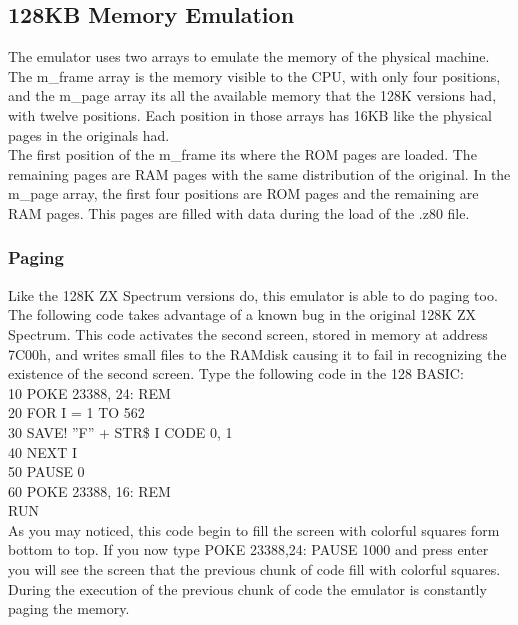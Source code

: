 \subsection{128KB Memory Emulation}
The emulator uses two arrays to emulate the memory of the physical machine. The m\_frame array is the memory visible to the CPU, with only four positions, and the m\_page array its all the available memory that the 128K versions had, with twelve positions. Each position in those arrays has 16KB like the physical pages in the originals had.\\
\indent The first position of the m\_frame its where the ROM pages are loaded. The remaining pages are RAM pages with the same distribution of the original. In the m\_page array, the first four positions are ROM pages and the remaining are RAM pages. This pages are filled with data during the load of the .z80 file.

\subsubsection{Paging}
Like the 128K ZX Spectrum versions do, this emulator is able to do paging too.
The following code takes advantage of a known bug in the original 128K ZX Spectrum. This code activates the second screen, stored in memory at address 7C00h, and writes small files to the RAMdisk causing it to fail in recognizing the existence of the second screen. Type the following code in the 128 BASIC:\\
10 POKE 23388, 24: REM\\
20 FOR I = 1 TO 562\\
30 SAVE! ''F'' + STR\$ I CODE 0, 1\\
40 NEXT I\\
50 PAUSE 0\\
60 POKE 23388, 16: REM\\
RUN\\
\indent As you may noticed, this code begin to fill the screen with colorful squares form bottom to top. If you now type POKE 23388,24: PAUSE 1000 and press enter you will see the screen that the previous chunk of code fill with colorful squares. During the execution of the previous chunk of code the emulator is constantly paging the memory.
